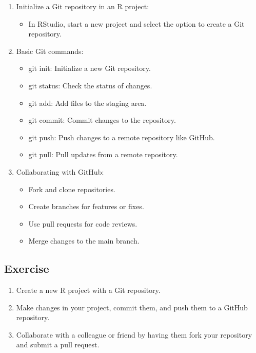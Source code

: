 \documentclass[
]{book}
\providecommand{\tightlist}{%
  \setlength{\itemsep}{0pt}\setlength{\parskip}{0pt}}
\begin{document}
\begin{enumerate}
\def\labelenumi{\arabic{enumi}.}
\setcounter{enumi}{2}
\tightlist
\item
  Initialize a Git repository in an R project:

  \begin{itemize}
  \tightlist
  \item
    In RStudio, start a new project and select the option to create a Git repository.
  \end{itemize}
\item
  Basic Git commands:

  \begin{itemize}
  \tightlist
  \item
    git init: Initialize a new Git repository.
  \item
    git status: Check the status of changes.
  \item
    git add: Add files to the staging area.
  \item
    git commit: Commit changes to the repository.
  \item
    git push: Push changes to a remote repository like GitHub.
  \item
    git pull: Pull updates from a remote repository.
  \end{itemize}
\item
  Collaborating with GitHub:

  \begin{itemize}
  \tightlist
  \item
    Fork and clone repositories.
  \item
    Create branches for features or fixes.
  \item
    Use pull requests for code reviews.
  \item
    Merge changes to the main branch.
  \end{itemize}
\end{enumerate}

\subsection*{Exercise}\label{exercise-17}

\begin{enumerate}
\def\labelenumi{\arabic{enumi}.}
\tightlist
\item
  Create a new R project with a Git repository.
\item
  Make changes in your project, commit them, and push them to a GitHub repository.
\item
  Collaborate with a colleague or friend by having them fork your repository and submit a pull request.
\end{enumerate}

  
\end{document}
